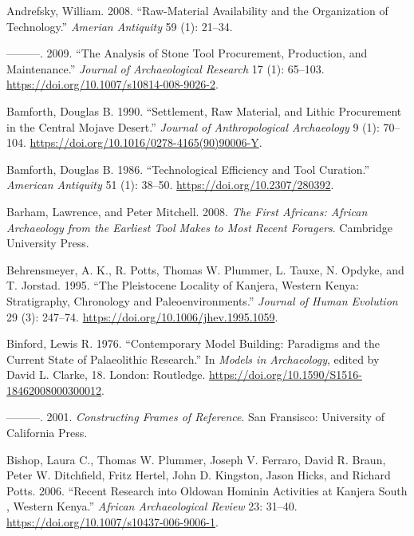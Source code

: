 \documentclass[]{elsarticle} %
\begin{document}
\hypertarget{refs}{}
\leavevmode\hypertarget{ref-andrefskyRawMaterialAvailabilityOrganization2008}{}%
Andrefsky, William. 2008. ``Raw-Material Availability and the
Organization of Technology.'' \emph{Amerian Antiquity} 59 (1): 21--34.

\leavevmode\hypertarget{ref-andrefskyAnalysisStoneTool2009}{}%
---------. 2009. ``The Analysis of Stone Tool Procurement, Production,
and Maintenance.'' \emph{Journal of Archaeological Research} 17 (1):
65--103. \url{https://doi.org/10.1007/s10814-008-9026-2}.

\leavevmode\hypertarget{ref-bamforthSettlementRawMaterial1990}{}%
Bamforth, Douglas B. 1990. ``Settlement, Raw Material, and Lithic
Procurement in the Central Mojave Desert.'' \emph{Journal of
Anthropological Archaeology} 9 (1): 70--104.
\url{https://doi.org/10.1016/0278-4165(90)90006-Y}.

\leavevmode\hypertarget{ref-bamforthTechnologicalEfficiencyTool1986}{}%
Bamforth, Douglas B. 1986. ``Technological Efficiency and Tool
Curation.'' \emph{American Antiquity} 51 (1): 38--50.
\url{https://doi.org/10.2307/280392}.

\leavevmode\hypertarget{ref-barhamFirstAfricansAfrican2008}{}%
Barham, Lawrence, and Peter Mitchell. 2008. \emph{The First Africans:
African Archaeology from the Earliest Tool Makes to Most Recent
Foragers}. Cambridge University Press.

\leavevmode\hypertarget{ref-behrensmeyerPleistoceneLocalityKanjera1995}{}%
Behrensmeyer, A. K., R. Potts, Thomas W. Plummer, L. Tauxe, N. Opdyke,
and T. Jorstad. 1995. ``The Pleistocene Locality of Kanjera, Western
Kenya: Stratigraphy, Chronology and Paleoenvironments.'' \emph{Journal
of Human Evolution} 29 (3): 247--74.
\url{https://doi.org/10.1006/jhev.1995.1059}.

\leavevmode\hypertarget{ref-binfordContemporaryModelBuilding1976}{}%
Binford, Lewis R. 1976. ``Contemporary Model Building: Paradigms and the
Current State of Palaeolithic Research.'' In \emph{Models in
Archaeology}, edited by David L. Clarke, 18. London: Routledge.
\url{https://doi.org/10.1590/S1516-18462008000300012}.

\leavevmode\hypertarget{ref-binfordConstructingFramesReference2001}{}%
---------. 2001. \emph{Constructing Frames of Reference}. San Fransisco:
University of California Press.

\leavevmode\hypertarget{ref-bishopRecentResearchOldowan2006}{}%
Bishop, Laura C., Thomas W. Plummer, Joseph V. Ferraro, David R. Braun,
Peter W. Ditchfield, Fritz Hertel, John D. Kingston, Jason Hicks, and
Richard Potts. 2006. ``Recent Research into Oldowan Hominin Activities
at Kanjera South , Western Kenya.'' \emph{African Archaeological Review}
23: 31--40. \url{https://doi.org/10.1007/s10437-006-9006-1}.
\end{document}
